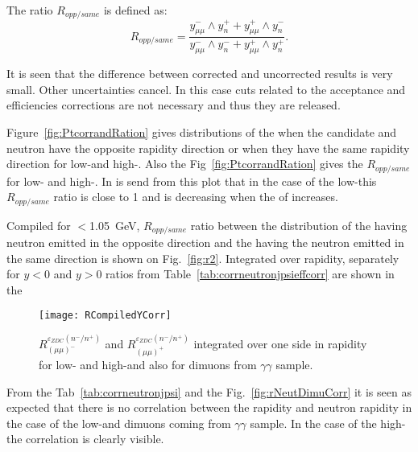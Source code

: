     The ratio $R_{opp/same}$ is defined as: 
    \begin{equation}
      R_{opp/same} = \frac{y^{-}_{\mu\mu} \wedge y_{n}^{+} + y^{+}_{\mu\mu} 
        \wedge y_{n}^{-}}{y^{-}_{\mu\mu} \wedge y_{n}^{-} + y^{+}_{\mu\mu} 
        \wedge y_{n}^{+}}.
    \end{equation}
    
    It is seen that the difference between corrected and uncorrected results is
      very small. 
    Other uncertainties cancel. 
    In this case cuts related to the acceptance and efficiencies corrections 
      are not necessary and thus they are released.
    
    Figure~\ref{fig:PtcorrandRation} gives \pt distributions of the \JPsi 
      when the \JPsi{} candidate and neutron have the opposite rapidity 
      direction or when they have the same rapidity direction for low-\pt and 
      high-\pt \JPsi{}. 
    Also the Fig~\ref{fig:PtcorrandRation} gives the $R_{opp/same}$ for low-\pt
      and high-\pt \JPsi. 
    In is send from this plot that in the case of the low-\pt \JPsi this 
      $R_{opp/same}$ ratio is close to 1 and is decreasing when the \pt of
      \JPsi{} increases.
      
    Compiled for \pt$<$1.05~GeV, $R_{opp/same}$ ratio between the \pt 
      distribution of the \JPsi having neutron emitted in the opposite 
      direction and  the \JPsi having the neutron emitted in the same
      direction is shown on Fig.~\ref{fig:r2}. 
    Integrated over rapidity, separately for $y<0$ and $y>0$ ratios from 
      Table~\ref{tab:corrneutronjpsieffcorr} are shown in the 
    
    \begin{figure*}[!Hhtb]
      \begin{center}
        \texttt{[image: RCompiledYCorr]}
        \caption{ \label{fig:integRatios} 
          $R_{(\mu\mu)^{-}}^{\varepsilon_{ZDC}(n^{-}/n^{+})}$ and 
          $R_{(\mu\mu)^{+}}^{\varepsilon_{ZDC}(n^{-}/n^{+})}$ integrated over 
          one side in rapidity for low- and high-\pt \JPsi and also for dimuons
          from $\gamma \gamma$ sample. }
      \end{center}
    \end{figure*}
    
    From the Tab~\ref{tab:corrneutronjpsi} and the Fig.~\ref{fig:rNeutDimuCorr} 
      it is seen as expected that there is no correlation between the \JPsi 
      rapidity and neutron rapidity in the case of the low-\pt \JPsi and 
      dimuons coming from $\gamma \gamma$ sample. 
    In the case of the high-\pt \JPsi the correlation is clearly visible. 



